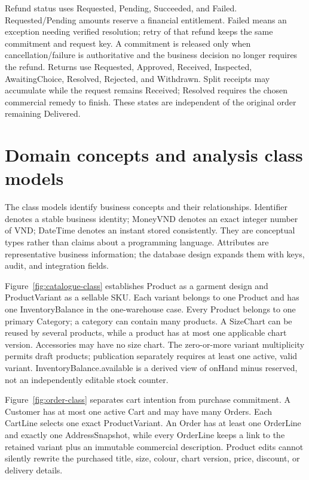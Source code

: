 Refund status uses Requested, Pending, Succeeded, and Failed. Requested/Pending amounts reserve a financial entitlement. Failed means an exception needing verified resolution; retry of that refund keeps the same commitment and request key. A commitment is released only when cancellation/failure is authoritative and the business decision no longer requires the refund. Returns use Requested, Approved, Received, Inspected, AwaitingChoice, Resolved, Rejected, and Withdrawn. Split receipts may accumulate while the request remains Received; Resolved requires the chosen commercial remedy to finish. These states are independent of the original order remaining Delivered.

\section{Domain concepts and analysis class models}
The class models identify business concepts and their relationships. Identifier denotes a stable business identity; MoneyVND denotes an exact integer number of VND; DateTime denotes an instant stored consistently. They are conceptual types rather than claims about a programming language. Attributes are representative business information; the database design expands them with keys, audit, and integration fields.

Figure~\ref{fig:catalogue-class} establishes Product as a garment design and ProductVariant as a sellable SKU. Each variant belongs to one Product and has one InventoryBalance in the one-warehouse case. Every Product belongs to one primary Category; a category can contain many products. A SizeChart can be reused by several products, while a product has at most one applicable chart version. Accessories may have no size chart. The zero-or-more variant multiplicity permits draft products; publication separately requires at least one active, valid variant. InventoryBalance.available is a derived view of onHand minus reserved, not an independently editable stock counter.

Figure~\ref{fig:order-class} separates cart intention from purchase commitment. A Customer has at most one active Cart and may have many Orders. Each CartLine selects one exact ProductVariant. An Order has at least one OrderLine and exactly one AddressSnapshot, while every OrderLine keeps a link to the retained variant plus an immutable commercial description. Product edits cannot silently rewrite the purchased title, size, colour, chart version, price, discount, or delivery details.

